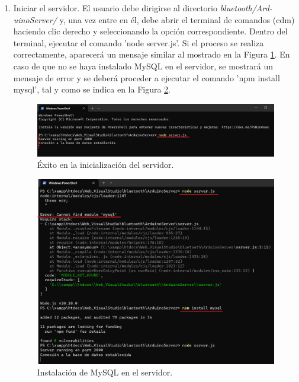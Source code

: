\begin{enumerate}
    \item Iniciar el servidor. El usuario debe dirigirse al directorio \textit{bluetooth/Ard-\\uinoServer/} y, una vez entre en él, debe abrir el terminal de comandos (cdm) haciendo clic derecho y seleccionando la opción correspondiente. Dentro del terminal, ejecutar el comando 'node server.js'. Si el proceso se realiza correctamente, aparecerá un mensaje similar al mostrado en la Figura \ref{fig:server}. En caso de que no se haya instalado MySQL en el servidor, se mostrará un mensaje de error y se deberá proceder a ejecutar el comando 'npm install mysql', tal y como se indica en la Figura \ref{fig:mysql}.

    \begin{figure}[h]
        \centering
        \includegraphics[width=1\textwidth]{img/B2_InstalacionPuestaMarcha/server_subrayado.png}
        \caption{Éxito en la inicialización del servidor.}
        \label{fig:server}
    \end{figure}

    \begin{figure}[h]
        \centering
        \includegraphics[width=1\textwidth]{img/B2_InstalacionPuestaMarcha/mysql_subrayado.png}
        \caption{Instalación de MySQL en el servidor.}
        \label{fig:mysql}
    \end{figure}
    

\end{enumerate}
